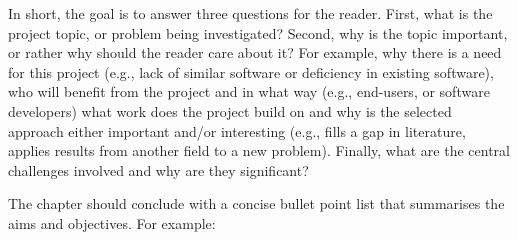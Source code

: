 \documentclass[ %
                    author={Jonathan Rankin},
                supervisor={Dr. David May, Dr. Ian Holyer},
                    degree={MEng},
                     title={CodeTouch},
                  subtitle={A Revolutionary Way To Program Real Code On Touch Screen Devices},
                      type={enterprise},
                      year={2015 } ]{dissertation}
\begin{document}
In short, the goal is to answer three questions for the reader.  First, 
what is the project topic, or problem being investigated?  Second, why 
is the topic important, or rather why should the reader care about it?  
For example, why there is a need for this project (e.g., lack of similar 
software or deficiency in existing software), who will benefit from the 
project and in what way (e.g., end-users, or software developers) what 
work does the project build on and why is the selected approach either
important and/or interesting (e.g., fills a gap in literature, applies
results from another field to a new problem).  Finally, what are the 
central challenges involved and why are they significant? 
 
The chapter should conclude with a concise bullet point list that 
summarises the aims and objectives.  For example:
\end{document}
